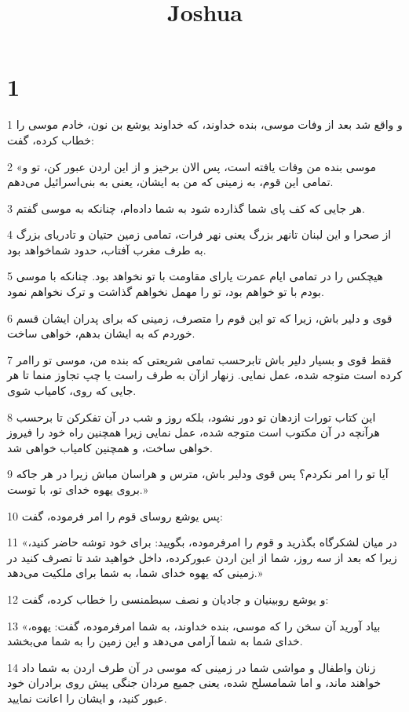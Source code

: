

\title{Joshua}

 
\chapter{1}

\par 1 و واقع شد بعد از وفات موسی، بنده خداوند، که خداوند یوشع بن نون، خادم موسی را خطاب کرده، گفت:
\par 2 «موسی بنده من وفات یافته است، پس الان برخیز و از این اردن عبور کن، تو و تمامی این قوم، به زمینی که من به ایشان، یعنی به بنی‌اسرائیل می‌دهم.
\par 3 هر جایی که کف پای شما گذارده شود به شما داده‌ام، چنانکه به موسی گفتم.
\par 4 از صحرا و این لبنان تانهر بزرگ یعنی نهر فرات، تمامی زمین حتیان و تادریای بزرگ به طرف مغرب آفتاب، حدود شماخواهد بود.
\par 5 هیچکس را در تمامی ایام عمرت یارای مقاومت با تو نخواهد بود. چنانکه با موسی بودم با تو خواهم بود، تو را مهمل نخواهم گذاشت و ترک نخواهم نمود.
\par 6 قوی و دلیر باش، زیرا که تو این قوم را متصرف، زمینی که برای پدران ایشان قسم خوردم که به ایشان بدهم، خواهی ساخت.
\par 7 فقط قوی و بسیار دلیر باش تابرحسب تمامی شریعتی که بنده من، موسی تو راامر کرده است متوجه شده، عمل نمایی. زنهار ازآن به طرف راست یا چپ تجاوز منما تا هر جایی که روی، کامیاب شوی.
\par 8 این کتاب تورات ازدهان تو دور نشود، بلکه روز و شب در آن تفکرکن تا برحسب هر‌آنچه در آن مکتوب است متوجه شده، عمل نمایی زیرا همچنین راه خود را فیروز خواهی ساخت، و همچنین کامیاب خواهی شد.
\par 9 آیا تو را امر نکردم؟ پس قوی ودلیر باش، مترس و هراسان مباش زیرا در هر جاکه بروی یهوه خدای تو، با توست.»
\par 10 پس یوشع روسای قوم را امر فرموده، گفت:
\par 11 «در میان لشکرگاه بگذرید و قوم را امرفرموده، بگویید: برای خود توشه حاضر کنید، زیرا که بعد از سه روز، شما از این اردن عبورکرده، داخل خواهید شد تا تصرف کنید در زمینی که یهوه خدای شما، به شما برای ملکیت می‌دهد.»
\par 12 و یوشع روبینیان و جادیان و نصف سبطمنسی را خطاب کرده، گفت:
\par 13 «بیاد آورید آن سخن را که موسی، بنده خداوند، به شما امرفرموده، گفت: یهوه، خدای شما به شما آرامی می‌دهد و این زمین را به شما می‌بخشد.
\par 14 زنان واطفال و مواشی شما در زمینی که موسی در آن طرف اردن به شما داد خواهند ماند، و اما شمامسلح شده، یعنی جمیع مردان جنگی پیش روی برادران خود عبور کنید، و ایشان را اعانت نمایید.
